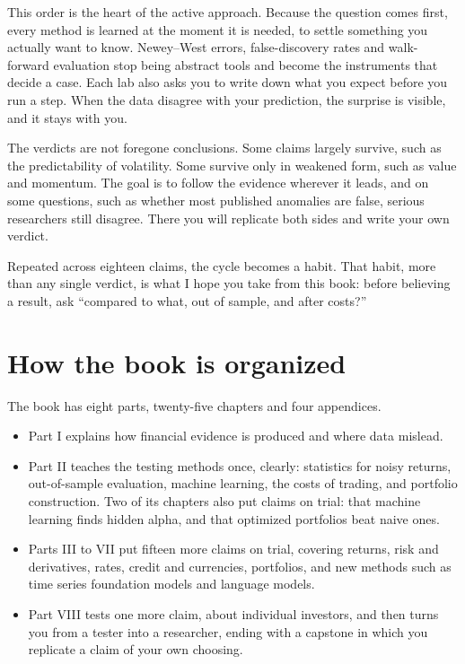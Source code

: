 This order is the heart of the active approach. Because the question comes first, every method is learned at the moment it is needed, to settle something you actually want to know. Newey--West errors, false-discovery rates and walk-forward evaluation stop being abstract tools and become the instruments that decide a case. Each lab also asks you to write down what you expect before you run a step. When the data disagree with your prediction, the surprise is visible, and it stays with you.

The verdicts are not foregone conclusions. Some claims largely survive, such as the predictability of volatility. Some survive only in weakened form, such as value and momentum. The goal is to follow the evidence wherever it leads, and on some questions, such as whether most published anomalies are false, serious researchers still disagree. There you will replicate both sides and write your own verdict.

Repeated across eighteen claims, the cycle becomes a habit. That habit, more than any single verdict, is what I hope you take from this book: before believing a result, ask ``compared to what, out of sample, and after costs?''

\section*{How the book is organized}

The book has eight parts, twenty-five chapters and four appendices.

\begin{itemize}
  \item Part I explains how financial evidence is produced and where data mislead.
  \item Part II teaches the testing methods once, clearly: statistics for noisy returns, out-of-sample evaluation, machine learning, the costs of trading, and portfolio construction. Two of its chapters also put claims on trial: that machine learning finds hidden alpha, and that optimized portfolios beat naive ones.
  \item Parts III to VII put fifteen more claims on trial, covering returns, risk and derivatives, rates, credit and currencies, portfolios, and new methods such as time series foundation models and language models.
  \item Part VIII tests one more claim, about individual investors, and then turns you from a tester into a researcher, ending with a capstone in which you replicate a claim of your own choosing.
\end{itemize}

